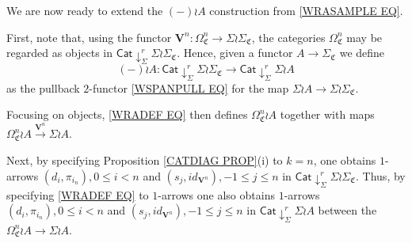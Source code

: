 \documentclass[a4paper,10pt
]{article}%
\numberwithin{equation}{section}
\numberwithin{figure}{section}
\theoremstyle{definition} %
\newcommand{\1}{\ensuremath{\mathbbm 1}}%
\begin{document}






\vskip 10pt


We are now ready to extend the $(-) \wr A$
construction from \eqref{WRASAMPLE EQ}.

First, note that, using the functor
$\boldsymbol{V}^n \colon \Omega^n_{\mathfrak{C}} \to \Sigma \wr \Sigma_{\mathfrak{C}}$,
the categories 
$\Omega^n_{\mathfrak{C}}$ may be regarded as objects in
$\mathsf{Cat} \downarrow^r_{\Sigma} \Sigma \wr \Sigma_{\mathfrak{C}}$.
Hence, given a functor $A \to \Sigma_{\mathfrak{C}}$
we define 
\begin{equation}\label{WRADEF EQ}
(-) \wr A \colon 
\mathsf{Cat} \downarrow^r_{\Sigma} \Sigma \wr \Sigma_{\mathfrak{C}}
\to
\mathsf{Cat} \downarrow^r_{\Sigma} \Sigma \wr A
\end{equation}
as the pullback $2$-functor \eqref{WSPANPULL EQ} for the map
$\Sigma \wr A \to \Sigma \wr \Sigma_{\mathfrak{C}}$.



Focusing on objects, \eqref{WRADEF EQ} then defines 
$\Omega_{\mathfrak{C}}^n \wr A$
together with maps 
$\Omega_{\mathfrak{C}}^n \wr A 
\xrightarrow{\boldsymbol{V}^n} \Sigma \wr A$.

Next, by specifying Proposition \ref{CATDIAG PROP}(i) to $k=n$,
one obtains $1$-arrows 
$(d_i,\pi_{i_n}), 0 \leq i < n$ and 
$(s_j,id_{\boldsymbol{V}^n}), -1 \leq j \leq n$
in 
$\mathsf{Cat} \downarrow^r_{\Sigma} \Sigma \wr \Sigma_{\mathfrak{C}}$.
Thus, by specifying \eqref{WRADEF EQ} to $1$-arrows
one also obtains $1$-arrows
$(d_i,\pi_{i_n}), 0 \leq i < n$ and 
$(s_j,id_{\boldsymbol{V}^n}), -1 \leq j \leq n$
in $\mathsf{Cat} \downarrow^r_{\Sigma} \Sigma \wr A$
between the $\Omega_{\mathfrak{C}}^n \wr A \to \Sigma \wr A$.
\end{document}
